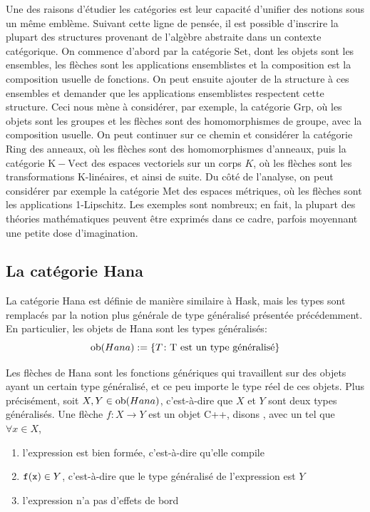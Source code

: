 Une des raisons d'étudier les catégories est leur capacité d'unifier des
notions sous un même emblème. Suivant cette ligne de pensée, il est possible
d'inscrire la plupart des structures provenant de l'algèbre abstraite dans
un contexte catégorique. On commence d'abord par la catégorie $\mathrm{Set}$,
dont les objets sont les ensembles, les flèches sont les applications
ensemblistes et la composition est la composition usuelle de fonctions.
On peut ensuite ajouter de la structure à ces ensembles et demander que
les applications ensemblistes respectent cette structure. Ceci nous mène
à considérer, par exemple, la catégorie $\mathrm{Grp}$, où les objets sont
les groupes et les flèches sont des homomorphismes de groupe, avec la
composition usuelle. On peut continuer sur ce chemin et considérer la
catégorie $\mathrm{Ring}$ des anneaux, où les flèches sont des homomorphismes
d'anneaux, puis la catégorie $\mathrm{K-Vect}$ des espaces vectoriels sur un
corps $K$, où les flèches sont les transformations K-linéaires, et ainsi de
suite. Du côté de l'analyse, on peut considérer par exemple la catégorie
$\mathrm{Met}$ des espaces métriques, où les flèches sont les applications
1-Lipschitz. Les exemples sont nombreux; en fait, la plupart des théories
mathématiques peuvent être exprimés dans ce cadre, parfois moyennant une
petite dose d'imagination.


\subsection{La catégorie Hana}
La catégorie Hana est définie de manière similaire à Hask, mais les types
sont remplacés par la notion plus générale de type généralisé présentée
précédemment. En particulier, les objets de Hana sont les types généralisés:
\[
    \mathrm{ob}(Hana) := \{ T \colon \text{T est un type généralisé} \}
\]

Les flèches de Hana sont les fonctions génériques qui travaillent sur des
objets ayant un certain type généralisé, et ce peu importe le type réel de ces
objets. Plus précisément, soit $X, Y \in \mathrm{ob}(Hana)$, c'est-à-dire que $X$ et $Y$
sont deux types généralisés. Une flèche $f : X \to Y$ est un objet C++, disons
, avec un  tel que $\forall x \in X$,
\begin{enumerate}
    \item l'expression  est bien formée, c'est-à-dire qu'elle compile
    \item ${\tt f(x)} \in Y$, c'est-à-dire que le type généralisé de l'expression  est $Y$
    \item l'expression  n'a pas d'effets de bord
\end{enumerate}

